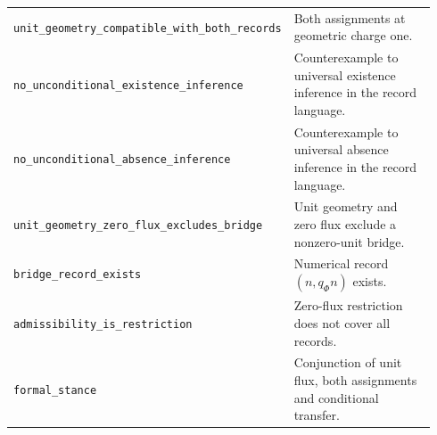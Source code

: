 \documentclass[11pt]{article}
\theoremstyle{definition}\newtheorem{definition}[theorem]{Definition}
\theoremstyle{remark}\newtheorem{remark}[theorem]{Remark}
\begin{document}
\begin{longtable}{p{0.49\linewidth}p{0.45\linewidth}}
\texttt{unit\_geometry\_compatible\_with\_both\_records} & Both assignments at geometric charge one.\\
\texttt{no\_unconditional\_existence\_inference} & Counterexample to universal existence inference in the record language.\\
\texttt{no\_unconditional\_absence\_inference} & Counterexample to universal absence inference in the record language.\\
\texttt{unit\_geometry\_zero\_flux\_excludes\_bridge} & Unit geometry and zero flux exclude a nonzero-unit bridge.\\
\texttt{bridge\_record\_exists} & Numerical record $(n,q_\Phi n)$ exists.\\
\texttt{admissibility\_is\_restriction} & Zero-flux restriction does not cover all records.\\
\texttt{formal\_stance} & Conjunction of unit flux, both assignments and conditional transfer.\\\bottomrule
\end{longtable}

\end{document}
